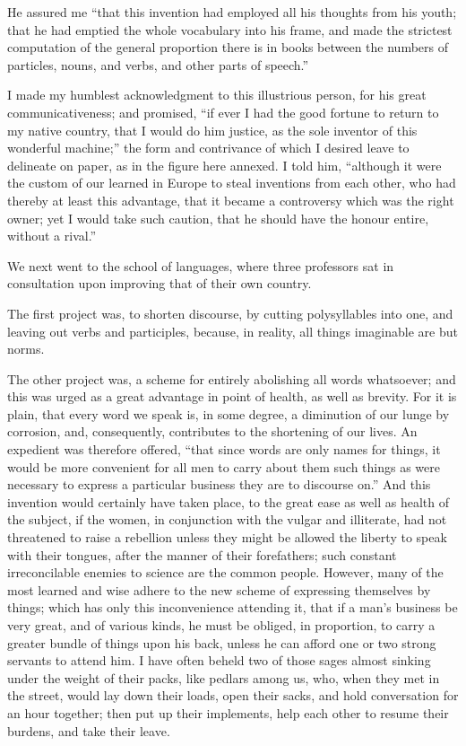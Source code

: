 He assured me “that this invention had employed all his thoughts from his youth; that he had emptied the whole vocabulary into his frame, and made the strictest computation of the general proportion there is in books between the numbers of particles, nouns, and verbs, and other parts of speech.”

I made my humblest acknowledgment to this illustrious person, for his great communicativeness; and promised, “if ever I had the good fortune to return to my native country, that I would do him justice, as the sole inventor of this wonderful machine;” the form and contrivance of which I desired leave to delineate on paper, as in the figure here annexed.  I told him, “although it were the custom of our learned in Europe to steal inventions from each other, who had thereby at least this advantage, that it became a controversy which was the right owner; yet I would take such caution, that he should have the honour entire, without a rival.”

We next went to the school of languages, where three professors sat in consultation upon improving that of their own country.

The first project was, to shorten discourse, by cutting polysyllables into one, and leaving out verbs and participles, because, in reality, all things imaginable are but norms.

The other project was, a scheme for entirely abolishing all words whatsoever; and this was urged as a great advantage in point of health, as well as brevity.  For it is plain, that every word we speak is, in some degree, a diminution of our lunge by corrosion, and, consequently, contributes to the shortening of our lives.  An expedient was therefore offered, “that since words are only names for things, it would be more convenient for all men to carry about them such things as were necessary to express a particular business they are to discourse on.”  And this invention would certainly have taken place, to the great ease as well as health of the subject, if the women, in conjunction with the vulgar and illiterate, had not threatened to raise a rebellion unless they might be allowed the liberty to speak with their tongues, after the manner of their forefathers; such constant irreconcilable enemies to science are the common people.  However, many of the most learned and wise adhere to the new scheme of expressing themselves by things; which has only this inconvenience attending it, that if a man’s business be very great, and of various kinds, he must be obliged, in proportion, to carry a greater bundle of things upon his back, unless he can afford one or two strong servants to attend him.  I have often beheld two of those sages almost sinking under the weight of their packs, like pedlars among us, who, when they met in the street, would lay down their loads, open their sacks, and hold conversation for an hour together; then put up their implements, help each other to resume their burdens, and take their leave.

